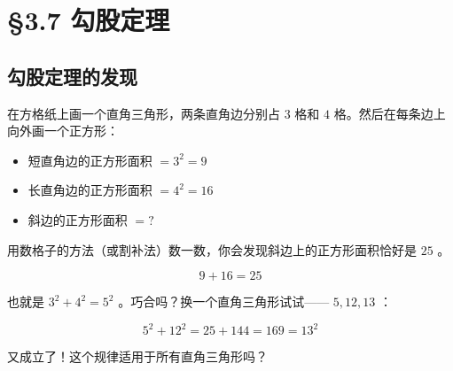 \chapter{§3.7 勾股定理}
\label{sec:3.7}





\section*{勾股定理的发现}


\begin{explore}


在方格纸上画一个直角三角形，两条直角边分别占 $3$ 格和 $4$ 格。然后在每条边上向外画一个正方形：

\begin{itemize}
  \item 短直角边的正方形面积 $= 3^2 = 9$
  \item 长直角边的正方形面积 $= 4^2 = 16$
  \item 斜边的正方形面积 $= ?$
\end{itemize}


用数格子的方法（或割补法）数一数，你会发现斜边上的正方形面积恰好是 $25$ 。

\[
9 + 16 = 25
\]


也就是 $3^2 + 4^2 = 5^2$ 。巧合吗？换一个直角三角形试试—— $5, 12, 13$ ：

\[
5^2 + 12^2 = 25 + 144 = 169 = 13^2
\]


又成立了！这个规律适用于所有直角三角形吗？

\end{explore}

